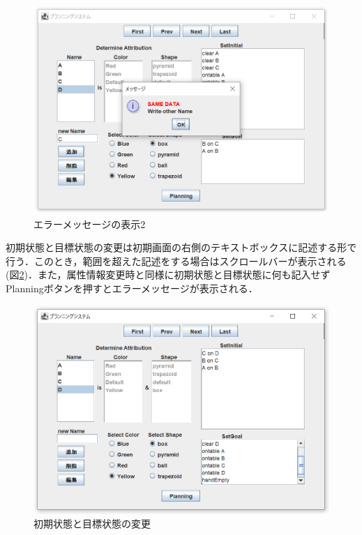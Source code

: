 \documentclass[12pt]{jarticle}
\begin{document}
\begin{figure}[htbp]
  \begin{center}
    \includegraphics[scale=0.6]{images/page8.PNG}
    \caption{エラーメッセージの表示2}
    \label{fig:page8}
  \end{center}
\end{figure}
\clearpage
初期状態と目標状態の変更は初期画面の右側のテキストボックスに記述する形で行う．このとき，範囲を超えた記述をする場合はスクロールバーが表示される(図\ref{fig:page9})．また，属性情報変更時と同様に初期状態と目標状態に何も記入せずPlanningボタンを押すとエラーメッセージが表示される．\\
\begin{figure}[htbp]
  \begin{center}
    \includegraphics[scale=0.6]{images/page9.PNG}
    \caption{初期状態と目標状態の変更}
    \label{fig:page9}
  \end{center}
\end{figure}
\clearpage
\end{document}
